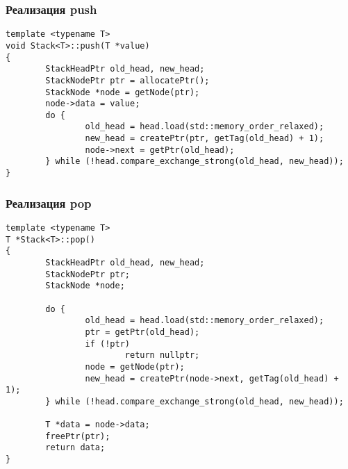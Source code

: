 \begin{frame}[fragile]
\frametitle{Реализация push}

\begin{lstlisting}
template <typename T>
void Stack<T>::push(T *value)
{
        StackHeadPtr old_head, new_head;
        StackNodePtr ptr = allocatePtr();
        StackNode *node = getNode(ptr);
        node->data = value;
        do {
                old_head = head.load(std::memory_order_relaxed);
                new_head = createPtr(ptr, getTag(old_head) + 1);
                node->next = getPtr(old_head);
        } while (!head.compare_exchange_strong(old_head, new_head));
}
\end{lstlisting}
\end{frame}

\begin{frame}[fragile]
\frametitle{Реализация pop}

\begin{lstlisting}
template <typename T>
T *Stack<T>::pop()
{
        StackHeadPtr old_head, new_head;
        StackNodePtr ptr;
        StackNode *node;

        do {
                old_head = head.load(std::memory_order_relaxed);
                ptr = getPtr(old_head);
                if (!ptr)
                        return nullptr;
                node = getNode(ptr);
                new_head = createPtr(node->next, getTag(old_head) + 1);
        } while (!head.compare_exchange_strong(old_head, new_head));

        T *data = node->data;
        freePtr(ptr);
        return data;
}
\end{lstlisting}
\end{frame}

